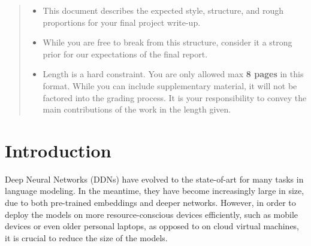 \documentclass[10pt]{article}
\begin{document}

\begin{abstract}
  \begin{itemize}
  \item This document describes the expected style, structure, and rough
  proportions for your final project write-up.
  \item While you are free to break from this structure, consider it a strong
  prior for our expectations of the final report.
  \item Length is a hard constraint. You are only allowed max \textbf{8 pages}
  in this format. While you can include supplementary material, it will not be
  factored into the grading process. It is your responsibility to convey the
  main contributions of the work in the length given.
  \end{itemize}



\end{abstract}

\section{Introduction}
\label{sec:introduction}


Deep Neural Networks (DDNs) have evolved to the state-of-art for many tasks in
language modeling. In the meantime, they have become increasingly large in
size, due to both pre-trained embeddings and deeper networks. However, in
order to deploy the models on more resource-conscious devices efficiently,
such as mobile devices or even older personal laptops, as opposed to on cloud
virtual machines, it is crucial to reduce the size of the models.
\end{document}
